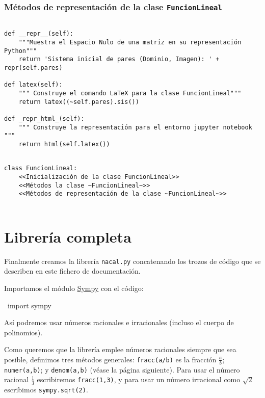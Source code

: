 \documentclass[11pt]{report}
\begin{document}
\section{Métodos de representación de la clase \texttt{FuncionLineal}}
\label{sec:org2ceb953}

\begin{verbatim}

def __repr__(self):
    """Muestra el Espacio Nulo de una matriz en su representación Python"""
    return 'Sistema inicial de pares (Dominio, Imagen): ' + repr(self.pares)

def latex(self):
    """ Construye el comando LaTeX para la clase FuncionLineal"""
    return latex((~self.pares).sis())

def _repr_html_(self):
    """ Construye la representación para el entorno jupyter notebook """
    return html(self.latex())

\end{verbatim}

\begin{verbatim}

class FuncionLineal:
    <<Inicialización de la clase FuncionLineal>>
    <<Métodos la clase ~FuncionLineal~>>
    <<Métodos de representación de la clase ~FuncionLineal~>>
    
\end{verbatim}



\part{Librería completa}
\label{sec:org77c2d7e}

Finalmente creamos la librería \texttt{nacal.py} concatenando los trozos de
código que se describen en este fichero de documentación.

Importamos el módulo \href{https://www.sympy.org/en/index.html}{Sympy} con el código:
\begin{center}
~import sympy~
\end{center}
Así podremos usar números racionales e irracionales (incluso el cuerpo
de polinomios). 

Como queremos que la librería emplee números racionales siempre que
sea posible, definimos tres métodos generales: \texttt{fracc(a/b)} es la
fracción \(\frac{a}{b}\); \texttt{numer(a,b)}; y \texttt{denom(a,b)} (véase la página
siguiente). Para usar el número racional \(\frac{1}{3}\) escribiremos
\texttt{fracc(1,3)}, y para usar un número irracional como \(\sqrt{2}\)
escribimos \texttt{sympy.sqrt(2)}. 
\end{document}
